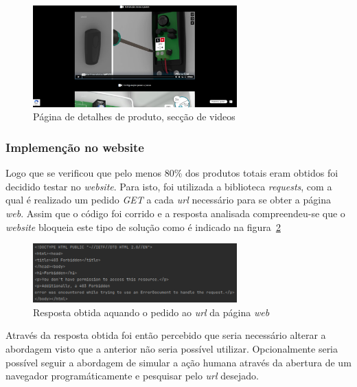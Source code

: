 \begin{figure}[htb]
    \centering
    
    \includegraphics[width=0.7\textwidth]{images/implementacao/scraper/pagina_detalhes_videos.png}
    \caption{Página de detalhes de produto, secção de videos}
    \label{fig:55}
\end{figure}

\newpage

\subsubsection{Implemenção no website}

Logo que se verificou que pelo menos 80\% dos produtos totais eram obtidos foi decidido testar no \textit{website}. Para isto, foi utilizada a biblioteca \textit{requests}, com a qual é realizado um pedido \textit{GET} a cada \textit{url} necessário para se obter a página \textit{web}. Assim que o código foi corrido e a resposta analisada compreendeu-se que o \textit{website} bloqueia este tipo de solução como é indicado na figura~\ref{fig:56}

\begin{figure}[htb]
    \centering
    \includegraphics[width=0.7\textwidth]{images/implementacao/scraper/forbiden_response.png}
    \caption{Resposta obtida aquando o pedido ao \textit{url} da página \textit{web}}
    \label{fig:56}
\end{figure}

Através da resposta obtida foi então percebido que seria necessário alterar a abordagem visto que a anterior não seria possível utilizar. Opcionalmente seria possível seguir a abordagem de simular a ação humana através da abertura de um navegador programáticamente e pesquisar pelo \textit{url} desejado. 

